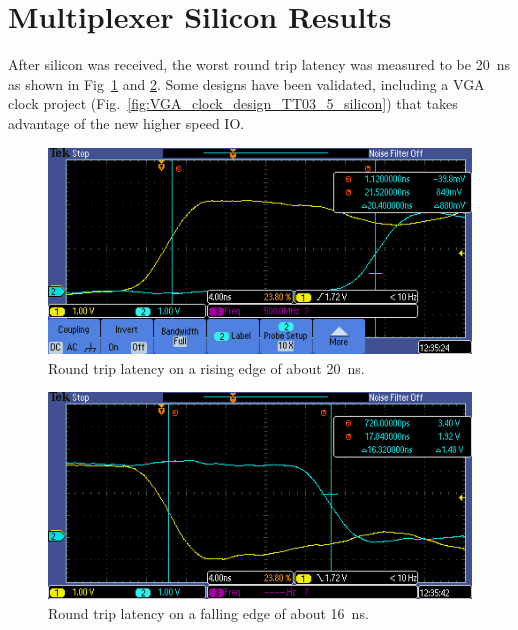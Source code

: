 \section{Multiplexer Silicon Results}
\label{sec:multiplexer_silicon_res}
After silicon was received, the worst round trip latency was measured to be \qty{20}{\ns} as shown in Fig~\ref{fig:round_trip_latency_rising_edge} and \ref{fig:round_trip_latency_falling_edge}. Some designs have been validated, including a VGA clock project (Fig.~\ref{fig:VGA_clock_design_TT03_5_silicon}) that takes advantage of the new higher speed IO.

\begin{figure}[!t]
\centering
\includegraphics[width=\columnwidth]{./Figs/tt3p5 rising latency.PNG}
\caption{Round trip latency on a rising edge of about \qty{20}{\ns}.}
\label{fig:round_trip_latency_rising_edge}
\end{figure}

\begin{figure}[!t]
\centering
\includegraphics[width=\columnwidth]{./Figs/tt3p5 falling latency.PNG}
\caption{Round trip latency on a falling edge of about \qty{16}{\ns}.}
\label{fig:round_trip_latency_falling_edge}
\end{figure}

